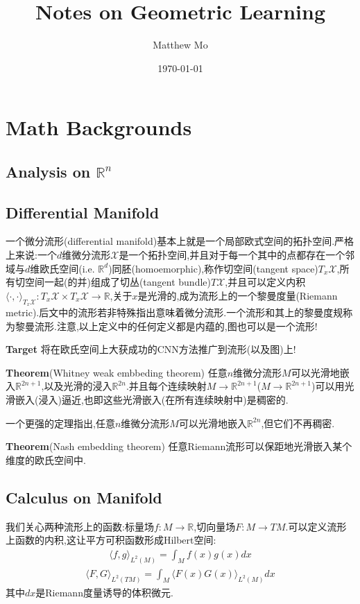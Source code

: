 \documentclass{article}
\title{\textbf{Notes on Geometric Learning}}
\author{Matthew Mo}
\date{\today}
\begin{document}
\maketitle
\tableofcontents
\section{Math Backgrounds}
\subsection{Analysis on $\mathbb R ^ n$}

\subsection{Differential Manifold}
一个微分流形(differential manifold)基本上就是一个局部欧式空间的拓扑空间.严格上来说:一个$d$维微分流形$\mathcal{X}$是一个拓扑空间,并且对于每一个其中的点都存在一个邻域与$d$维欧氏空间(i.e. $\mathbb{R}^d$)同胚(homoemorphic),称作切空间(tangent space)$T_x\mathcal{X}$,所有切空间一起(的并)组成了切丛(tangent bundle)$T\mathcal{X}$,并且可以定义内积$\langle \cdot, \cdot \rangle_{T_x\mathcal{X}}:T_x\mathcal{X}\times T_x\mathcal{X} \rightarrow \mathbb{R}$,关于$x$是光滑的,成为流形上的一个黎曼度量(Riemann metric).后文中的流形若非特殊指出意味着微分流形.一个流形和其上的黎曼度规称为黎曼流形.注意,以上定义中的任何定义都是内蕴的,图也可以是一个流形!

\textbf{Target} 将在欧氏空间上大获成功的CNN方法推广到流形(以及图)上!

\textbf{Theorem}(Whitney weak embbeding theorem) 任意$n$维微分流形$M$可以光滑地嵌入$\mathbb{R}^{2n+1}$,以及光滑的浸入$\mathbb{R}^{2n}$.并且每个连续映射$M\rightarrow \mathbb{R}^{2n+1}$($M\rightarrow \mathbb{R}^{2n+1}$)可以用光滑嵌入(浸入)逼近,也即这些光滑嵌入(在所有连续映射中)是稠密的.

一个更强的定理指出,任意$n$维微分流形$M$可以光滑地嵌入$\mathbb{R}^{2n}$,但它们不再稠密.

\textbf{Theorem}(Nash embedding theorem) 任意Riemann流形可以保距地光滑嵌入某个维度的欧氏空间中.

\subsection{Calculus on Manifold}
我们关心两种流形上的函数:标量场$f:M\rightarrow \mathbb{R}$,切向量场$F:M\rightarrow TM$.可以定义流形上函数的内积,这让平方可积函数形成Hilbert空间:
\begin{align}\langle f, g\rangle_{L^2(M)}=\int_M f(x)g(x) dx\end{align}
\begin{align}\langle F, G\rangle_{L^2(TM)}=\int_M \langle F(x)G(x) \rangle_{L^2(M)} dx
\end{align}
其中$dx$是Riemann度量诱导的体积微元.
\end{document}
